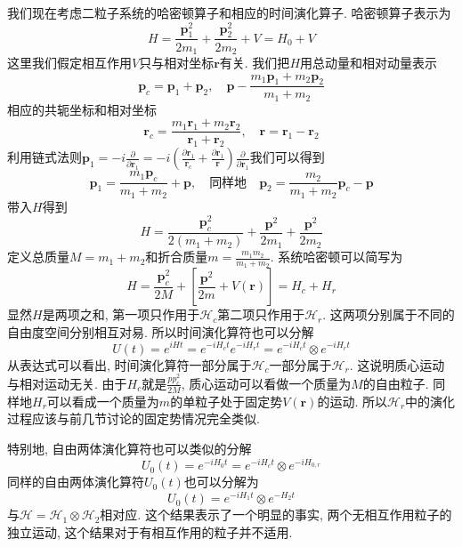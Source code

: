 \documentclass[a4paper,11pt]{book}
\newcommand{\mr}{\mathbf{r}}
\newcommand{\pp}{\mathbf{p}}
\begin{document}
我们现在考虑二粒子系统的哈密顿算子和相应的时间演化算子. 哈密顿算子表示为
\begin{equation*}
  H=\frac{\mathbf{p}_1^2}{2m_1}+\frac{\mathbf{p}_2^2}{2m_2}+V=H_0+V
\end{equation*}
这里我们假定相互作用$V$只与相对坐标$\mathbf{r}$有关. 我们把$H$用总动量和相对动量表示
\begin{equation*}
  \mathbf{p}_c=\mathbf{p}_1+\mathbf{p}_2,\quad \mathbf{p}-\frac{m_1\mathbf{p}_1+m_2\mathbf{p}_2}{m_1+m_2}
\end{equation*}
相应的共轭坐标和相对坐标
\begin{equation*}
  \mathbf{r}_c=\frac{m_1\mr_1+m_2\mr_2}{\mr_1+\mr_2},\quad \mr=\mr_1-\mr_2
\end{equation*}
利用链式法则$\pp_1=-i\frac{\partial}{\partial\mr_1}=-i(\frac{\partial\mr_1}{\mr_c}+\frac{\partial\mr_1}{\mr})\frac{\partial}{\partial\mr_1}$我们可以得到
\begin{equation*}
  \pp_1=\frac{m_1\pp_c}{m_1+m_2}+\pp,\quad\text{同样地}\quad\pp_2=\frac{m_2}{m_1+m_2}\pp_c-\pp
\end{equation*}
带入$H$得到
\begin{equation*}
  H=\frac{\pp_c^2}{2(m_1+m_2)}+\frac{\pp^2}{2m_1}+\frac{\pp^2}{2m_2}
\end{equation*}
定义总质量$M=m_1+m_2$和折合质量$m=\frac{m_1m_2}{m_1+m_2}$. 系统哈密顿可以简写为
\begin{equation*}
  H=\frac{\pp_c^2}{2M}+\left[\frac{\pp^2}{2m}+V(\mr)\right]=H_c+H_r
\end{equation*}
显然$H$是两项之和, 第一项只作用于$\mathcal{H}_c$第二项只作用于$\mathcal{H}_r$. 这两项分别属于不同的自由度空间分别相互对易. 所以时间演化算符也可以分解
\begin{equation}\label{scatter time evo}
  U(t)=e^{iHt}=e^{-iH_{c}t}e^{-iH_{r}t}=e^{-iH_ct}\otimes e^{-iH_rt}
\end{equation}
从表达式可以看出, 时间演化算符一部分属于$\mathcal{H}_c$一部分属于$\mathcal{H}_r$. 这说明质心运动与相对运动无关. 由于$H_c$就是$\frac{pp_c^2}{2M}$, 质心运动可以看做一个质量为$M$的自由粒子. 同样地$H_r$可以看成一个质量为$m$的单粒子处于固定势$V(\mr)$的运动. 所以$\mathcal{H}_r$中的演化过程应该与前几节讨论的固定势情况完全类似.

特别地, 自由两体演化算符也可以类似的分解
\begin{equation*}
  U_0(t)=e^{-iH_0t}=e^{-iH_ct}\otimes e^{-iH_{0,r}}
\end{equation*}
同样的自由两体演化算符$U_0(t)$也可以分解为
\begin{equation}\label{scatter free evo}
  U_0(t)=e^{-iH_1t}\otimes e^{-H_2t}
\end{equation}
与$\mathcal{H}=\mathcal{H}_1\otimes\mathcal{H}_2$相对应. 这个结果表示了一个明显的事实, 两个无相互作用粒子的独立运动, 这个结果对于有相互作用的粒子并不适用.
\end{document}
